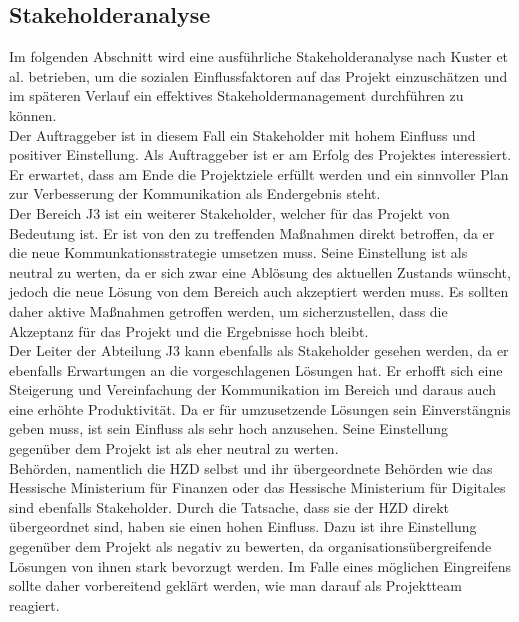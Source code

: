 \documentclass[ThesisDJ.tex]{subfiles}
\begin{document}
  \subsection{Stakeholderanalyse}
  Im folgenden Abschnitt wird eine ausführliche Stakeholderanalyse nach Kuster et al. \cite[S.~86ff]{kuster_handbuch_2022} betrieben, um die sozialen Einflussfaktoren
  auf das Projekt einzuschätzen und im späteren Verlauf ein effektives Stakeholdermanagement durchführen zu können. \\

  Der Auftraggeber ist in diesem Fall ein Stakeholder mit hohem Einfluss und positiver Einstellung. Als Auftraggeber ist er 
  am Erfolg des Projektes interessiert. Er erwartet, dass am Ende die Projektziele erfüllt werden und ein sinnvoller Plan zur Verbesserung 
  der Kommunikation als Endergebnis steht. \\

  Der Bereich J3 ist ein weiterer Stakeholder, welcher für das Projekt von Bedeutung ist. Er ist von den zu treffenden Maßnahmen direkt 
  betroffen, da er die neue Kommunkationsstrategie umsetzen muss. Seine Einstellung ist als neutral zu werten, da er sich zwar eine 
  Ablösung des aktuellen Zustands wünscht, jedoch die neue Lösung von dem Bereich auch akzeptiert werden muss. Es sollten daher aktive 
  Maßnahmen getroffen werden, um sicherzustellen, dass die Akzeptanz für das Projekt und die Ergebnisse hoch bleibt. \\

  Der Leiter der Abteilung J3 kann ebenfalls als Stakeholder gesehen werden, da er ebenfalls Erwartungen an die vorgeschlagenen Lösungen hat.
  Er erhofft sich eine Steigerung und Vereinfachung der Kommunikation im Bereich und daraus auch eine erhöhte Produktivität. Da er für 
  umzusetzende Lösungen sein Einverstängnis geben muss, ist sein Einfluss als sehr hoch anzusehen. Seine Einstellung gegenüber dem Projekt 
  ist als eher neutral zu werten. \\

  Behörden, namentlich die HZD selbst und ihr übergeordnete Behörden wie das Hessische Ministerium für Finanzen oder das Hessische Ministerium 
  für Digitales sind ebenfalls Stakeholder. Durch die Tatsache, dass sie der HZD direkt übergeordnet sind, haben sie einen hohen Einfluss. Dazu 
  ist ihre Einstellung gegenüber dem Projekt als negativ zu bewerten, da organisationsübergreifende Lösungen von ihnen stark bevorzugt werden.
  Im Falle eines möglichen Eingreifens sollte daher vorbereitend geklärt werden, wie man darauf als Projektteam reagiert. \\
\end{document}
